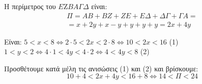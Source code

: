 
\begin{alist}
\item Η περίμετρος του $E \text{Z} B A \Gamma \Delta$ είναι:
\begin{gather*}
\Pi = AB + BZ + ZE + E\Delta + \Delta\Gamma + \Gamma A = \\
= x + 2y + x - y + y + y + y = 2x + 4y
\end{gather*}

\item Είναι:
$5 < x < 8 \Leftrightarrow 2 \cdot 5 < 2x < 2 \cdot 8 \Leftrightarrow 10 < 2x < 16$ (1)
$1 < y < 2 \Leftrightarrow 4 \cdot 1 < 4y < 4 \cdot 2 \Leftrightarrow 4 < 4y < 8$ (2)

Προσθέτουμε κατά μέλη τις ανισώσεις (1) και (2) και βρίσκουμε:
\[10 + 4 < 2x + 4y < 16 + 8 \Leftrightarrow 14 < \Pi < 24\]
\end{alist}

